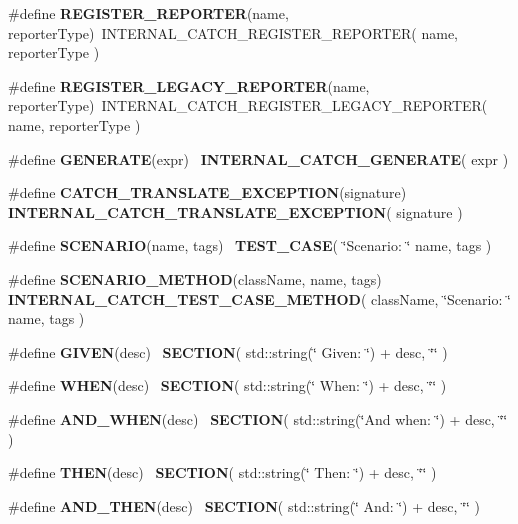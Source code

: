\begin{DoxyCompactItemize}
$$\item 
\#define \textbf{ R\+E\+G\+I\+S\+T\+E\+R\+\_\+\+R\+E\+P\+O\+R\+T\+ER}(name,  reporter\+Type)~I\+N\+T\+E\+R\+N\+A\+L\+\_\+\+C\+A\+T\+C\+H\+\_\+\+R\+E\+G\+I\+S\+T\+E\+R\+\_\+\+R\+E\+P\+O\+R\+T\+ER( name, reporter\+Type )
\item 
\#define \textbf{ R\+E\+G\+I\+S\+T\+E\+R\+\_\+\+L\+E\+G\+A\+C\+Y\+\_\+\+R\+E\+P\+O\+R\+T\+ER}(name,  reporter\+Type)~I\+N\+T\+E\+R\+N\+A\+L\+\_\+\+C\+A\+T\+C\+H\+\_\+\+R\+E\+G\+I\+S\+T\+E\+R\+\_\+\+L\+E\+G\+A\+C\+Y\+\_\+\+R\+E\+P\+O\+R\+T\+ER( name, reporter\+Type )
\item 
\#define \textbf{ G\+E\+N\+E\+R\+A\+TE}(expr)~\textbf{ I\+N\+T\+E\+R\+N\+A\+L\+\_\+\+C\+A\+T\+C\+H\+\_\+\+G\+E\+N\+E\+R\+A\+TE}( expr )
\item 
\#define \textbf{ C\+A\+T\+C\+H\+\_\+\+T\+R\+A\+N\+S\+L\+A\+T\+E\+\_\+\+E\+X\+C\+E\+P\+T\+I\+ON}(signature)~\textbf{ I\+N\+T\+E\+R\+N\+A\+L\+\_\+\+C\+A\+T\+C\+H\+\_\+\+T\+R\+A\+N\+S\+L\+A\+T\+E\+\_\+\+E\+X\+C\+E\+P\+T\+I\+ON}( signature )
\item 
\#define \textbf{ S\+C\+E\+N\+A\+R\+IO}(name,  tags)~\textbf{ T\+E\+S\+T\+\_\+\+C\+A\+SE}( \char`\"{}Scenario\+: \char`\"{} name, tags )
\item 
\#define \textbf{ S\+C\+E\+N\+A\+R\+I\+O\+\_\+\+M\+E\+T\+H\+OD}(class\+Name,  name,  tags)~\textbf{ I\+N\+T\+E\+R\+N\+A\+L\+\_\+\+C\+A\+T\+C\+H\+\_\+\+T\+E\+S\+T\+\_\+\+C\+A\+S\+E\+\_\+\+M\+E\+T\+H\+OD}( class\+Name, \char`\"{}Scenario\+: \char`\"{} name, tags )
\item 
\#define \textbf{ G\+I\+V\+EN}(desc)~\textbf{ S\+E\+C\+T\+I\+ON}( std\+::string(\char`\"{}   Given\+: \char`\"{}) + desc, \char`\"{}\char`\"{} )
\item 
\#define \textbf{ W\+H\+EN}(desc)~\textbf{ S\+E\+C\+T\+I\+ON}( std\+::string(\char`\"{}    When\+: \char`\"{}) + desc, \char`\"{}\char`\"{} )
\item 
\#define \textbf{ A\+N\+D\+\_\+\+W\+H\+EN}(desc)~\textbf{ S\+E\+C\+T\+I\+ON}( std\+::string(\char`\"{}And when\+: \char`\"{}) + desc, \char`\"{}\char`\"{} )
\item 
\#define \textbf{ T\+H\+EN}(desc)~\textbf{ S\+E\+C\+T\+I\+ON}( std\+::string(\char`\"{}    Then\+: \char`\"{}) + desc, \char`\"{}\char`\"{} )
\item 
\#define \textbf{ A\+N\+D\+\_\+\+T\+H\+EN}(desc)~\textbf{ S\+E\+C\+T\+I\+ON}( std\+::string(\char`\"{}     And\+: \char`\"{}) + desc, \char`\"{}\char`\"{} )
\end{DoxyCompactItemize}
